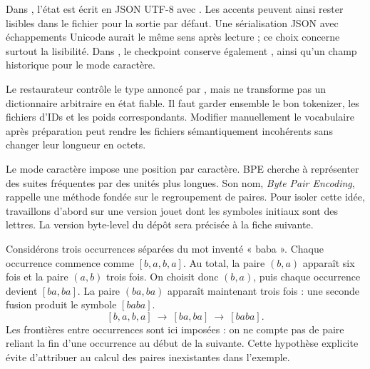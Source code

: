 Dans , l'état est écrit en JSON UTF-8
avec . Les accents peuvent ainsi rester lisibles
dans le fichier
pour la sortie par défaut. Une sérialisation JSON avec échappements Unicode
aurait le même sens après lecture ; ce choix concerne surtout la lisibilité.
Dans , le checkpoint conserve également
, ainsi qu'un champ  historique
pour le mode caractère.

Le restaurateur contrôle le type annoncé par , mais ne transforme
pas un dictionnaire arbitraire en état fiable. Il faut garder ensemble
le bon tokenizer, les fichiers d'IDs et les poids correspondants.
Modifier manuellement le vocabulaire après préparation peut rendre les fichiers
sémantiquement incohérents sans changer leur longueur en octets.


Le mode caractère impose une position par caractère. BPE cherche à représenter
des suites fréquentes par des unités plus longues. Son nom, \emph{Byte Pair
Encoding}, rappelle une méthode fondée sur le regroupement de paires.
Pour isoler cette idée, travaillons d'abord sur une version jouet dont les
symboles initiaux sont des lettres. La version byte-level du dépôt sera
précisée à la fiche suivante.

Considérons trois occurrences séparées du mot inventé « baba ».
Chaque occurrence commence comme \([b,a,b,a]\).
Au total, la paire \((b,a)\) apparaît six fois et la paire \((a,b)\)
trois fois. On choisit donc \((b,a)\), puis chaque occurrence devient
\([ba,ba]\). La paire \((ba,ba)\) apparaît maintenant trois fois :
une seconde fusion produit le symbole \([baba]\).
\[
    [b,a,b,a]\ \longrightarrow\ [ba,ba]\ \longrightarrow\ [baba].
\]
Les frontières entre occurrences sont ici imposées : on ne compte pas de
paire reliant la fin d'une occurrence au début de la suivante.
Cette hypothèse explicite évite d'attribuer au calcul des paires inexistantes
dans l'exemple.

